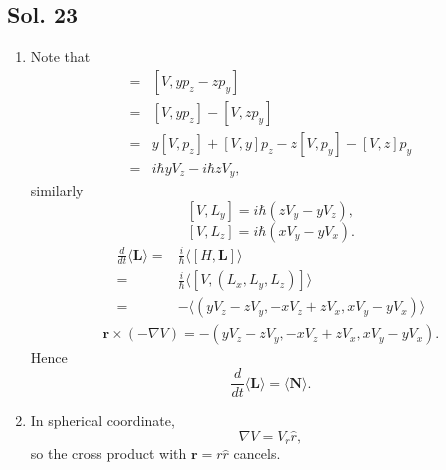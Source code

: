    \subsection*{Sol. 23}
   \begin{enumerate}
       \item 
       Note that 
   \begin{align*}
   [V, L_x] = &
   [V, yp_z-zp_y]\\
   =&[V, yp_z] - [V,zp_y]\\
   =&y[V,p_z] + [V,y]p_z - z[V,p_y]-[V,z]p_y\\
   =&i\hbar yV_z- i\hbar zV_y,
   \end{align*}
   similarly 
   $$
   [V, L_y]=i\hbar(zV_y-yV_z),
   $$
   $$
   [V, L_z]=i\hbar(xV_y-yV_x).
   $$
   \begin{align*}
       \frac{d}{dt}\langle \bm{L}\rangle
       =&\frac{i}{\hbar}
       \langle [H, \bm{L}]\rangle\\
       =&\frac{i}{\hbar}\langle[V, (L_x, L_y, L_z)]\rangle\\
       =&-\langle(yV_z-zV_y, -xV_z+zV_x, xV_y-yV_x)\rangle
   \end{align*}
   \begin{align*}
       \bm{r}\times (-\nabla V)
       =-(yV_z-zV_y, -xV_z+zV_x, xV_y-yV_x).
   \end{align*}
   Hence 
   $$
   \frac{d}{dt}\langle\bm{L}\rangle
   =\langle \bm{N}\rangle.
   $$
   \item 
   In spherical coordinate, $$\nabla V=V_r\hat{r},$$ so the cross product with $\bm{r}=r\hat{r}$ cancels.
   \end{enumerate}

